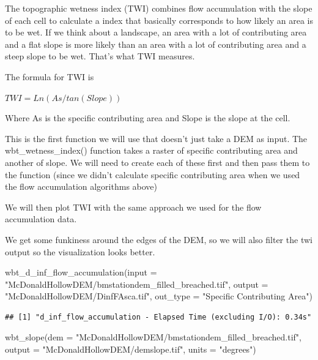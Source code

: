 \documentclass[
]{book}
\newenvironment{Shaded}{\begin{snugshade}}{\end{snugshade}}
\newcommand{\AttributeTok}[1]{\textcolor[rgb]{0.77,0.63,0.00}{#1}}
\newcommand{\FunctionTok}[1]{\textcolor[rgb]{0.00,0.00,0.00}{#1}}
\newcommand{\NormalTok}[1]{#1}
\newcommand{\StringTok}[1]{\textcolor[rgb]{0.31,0.60,0.02}{#1}}
\begin{document}
The topographic wetness index (TWI) combines flow accumulation with the slope of each cell to calculate a index that basically corresponds to how likely an area is to be wet. If we think about a landscape, an area with a lot of contributing area and a flat slope is more likely than an area with a lot of contributing area and a steep slope to be wet. That's what TWI measures.

The formula for TWI is

\(TWI = Ln(As / tan(Slope))\)

Where As is the specific contributing area and Slope is the slope at the cell.

This is the first function we will use that doesn't just take a DEM as input. The wbt\_wetness\_index() function takes a raster of specific contributing area and another of slope. We will need to create each of these first and then pass them to the function (since we didn't calculate specific contributing area when we used the flow accumulation algorithms above)

We will then plot TWI with the same approach we used for the flow accumulation data.

We get some funkiness around the edges of the DEM, so we will also filter the twi output so the visualization looks better.

\begin{Shaded}
\begin{Highlighting}[]
\FunctionTok{wbt\_d\_inf\_flow\_accumulation}\NormalTok{(}\AttributeTok{input =} \StringTok{"McDonaldHollowDEM/bmstationdem\_filled\_breached.tif"}\NormalTok{,}
                            \AttributeTok{output =} \StringTok{"McDonaldHollowDEM/DinfFAsca.tif"}\NormalTok{,}
                            \AttributeTok{out\_type =} \StringTok{"Specific Contributing Area"}\NormalTok{)}
\end{Highlighting}
\end{Shaded}

\begin{verbatim}
## [1] "d_inf_flow_accumulation - Elapsed Time (excluding I/O): 0.34s"
\end{verbatim}

\begin{Shaded}
\begin{Highlighting}[]
\FunctionTok{wbt\_slope}\NormalTok{(}\AttributeTok{dem =} \StringTok{"McDonaldHollowDEM/bmstationdem\_filled\_breached.tif"}\NormalTok{,}
          \AttributeTok{output =} \StringTok{"McDonaldHollowDEM/demslope.tif"}\NormalTok{,}
          \AttributeTok{units =} \StringTok{"degrees"}\NormalTok{)}
\end{Highlighting}
\end{Shaded}
\end{document}
